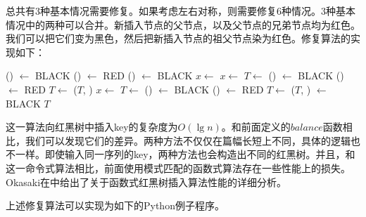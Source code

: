 \documentclass[UTF8]{article}
\begin{document}
总共有3种基本情况需要修复。如果考虑左右对称，则需要修复6种情况。3种基本情况中的两种可以合并。新插入节点的父节点，以及父节点的兄弟节点均为红色。我们可以把它们变为黑色，然后把新插入节点的祖父节点染为红色。修复算法的实现如下：

\begin{algorithmic}[1]
      \State {}() $\gets$ BLACK
      \State {}() $\gets$ RED
      \State {}() $\gets$ BLACK
      \State $x \gets$ 
    \Else
          \State $x \gets$ 
          \State $T \gets$ 
        \EndIf
        \State {}() $\gets$ BLACK
        \State {}() $\gets$ RED
        \State $T \gets$ ($T$, )
      \Else
          \State $x \gets$ 
          \State $T \gets$ 
        \EndIf
        \State {}() $\gets$ BLACK
        \State {}() $\gets$ RED
        \State $T \gets$ ($T$, )
      \EndIf
    \EndIf
  \EndWhile
  \State {} $\gets$ BLACK
  \State \Return $T$
\EndFunction
\end{algorithmic}

这一算法向红黑树中插入key的复杂度为$O(\lg n)$。和前面定义的$balance$函数相比，我们可以发现它们的差异。两种方法不仅仅在篇幅长短上不同，具体的逻辑也不一样。即使输入同一序列的key，两种方法也会构造出不同的红黑树。并且，和这一命令式算法相比，前面使用模式匹配的函数式算法存在一些性能上的损失。Okasaki在\cite{okasaki}中给出了关于函数式红黑树插入算法性能的详细分析。

上述修复算法可以实现为如下的Python例子程序。
\end{document}
